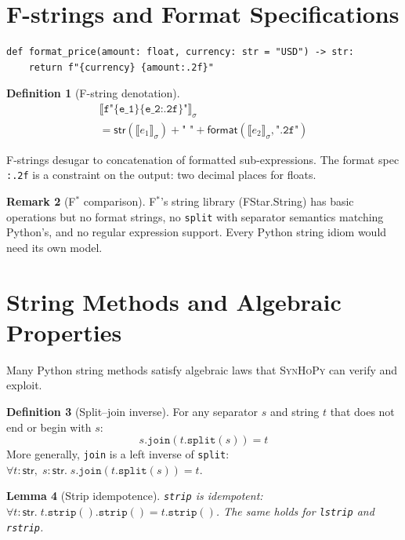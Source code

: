 \documentclass[11pt,a4paper]{report}
\theoremstyle{definition}
\newtheorem{definition}{Definition}[chapter]
\newtheorem{remark}[definition]{Remark}
\theoremstyle{plain}
\newtheorem{lemma}[definition]{Lemma}
\newcommand{\den}[1]{\llbracket #1 \rrbracket}
\newcommand{\fstar}{F$^{*}$}
\newcommand{\synhopy}{\textsc{SynHoPy}}
\begin{document}
\section{F-strings and Format Specifications}

\begin{lstlisting}[style=python]
def format_price(amount: float, currency: str = "USD") -> str:
    return f"{currency} {amount:.2f}"
\end{lstlisting}

\begin{definition}[F-string denotation]
\begin{multline*}
  \den{\texttt{f"\{e\_1\} \{e\_2:.2f\}"}}_\sigma \\
  = \mathsf{str}(\den{e_1}_\sigma) + \texttt{" "} + \mathsf{format}(\den{e_2}_\sigma, \texttt{".2f"})
\end{multline*}
\end{definition}

F-strings desugar to concatenation of formatted sub-expressions.  The format
spec \texttt{:.2f} is a constraint on the output: two decimal places for floats.

\begin{remark}[\fstar{} comparison]
\fstar{}'s string library (FStar.String) has basic operations but no format
strings, no \texttt{split} with separator semantics matching Python's, and no
regular expression support.  Every Python string idiom would need its own
model.
\end{remark}

\section{String Methods and Algebraic Properties}

Many Python string methods satisfy algebraic laws that \synhopy{} can
verify and exploit.

\begin{definition}[Split--join inverse]
For any separator $s$ and string $t$ that does not end or begin with $s$:
\[
  s.\texttt{join}(t.\texttt{split}(s)) = t
\]
More generally, \texttt{join} is a left inverse of \texttt{split}:
$\forall t : \mathsf{str},\; s : \mathsf{str}.\;
  s.\texttt{join}(t.\texttt{split}(s)) = t$.
\end{definition}

\begin{lemma}[Strip idempotence]
\label{lem:strip-idempotent}
\texttt{strip} is idempotent:
$\forall t : \mathsf{str}.\; t.\texttt{strip}().\texttt{strip}() =
t.\texttt{strip}()$.
The same holds for \texttt{lstrip} and \texttt{rstrip}.
\end{lemma}
\end{document}
